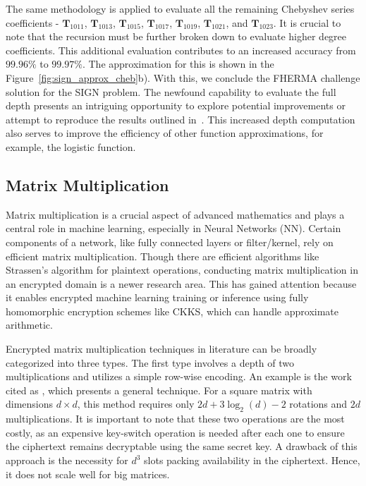 \documentclass[journal=tosc,final]{iacrtrans}
\begin{document}
The same methodology is applied to evaluate all the remaining Chebyshev series coefficients - $\textbf{T}_{1011}$, $\textbf{T}_{1013}$, $\textbf{T}_{1015}$, $\textbf{T}_{1017}$, $\textbf{T}_{1019}$, $\textbf{T}_{1021}$, and $\textbf{T}_{1023}$. It is crucial to note that the recursion must be further broken down to evaluate higher degree coefficients. This additional evaluation contributes to an increased accuracy from $99.96\%$ to $99.97\%$. The approximation for this is shown in the Figure~\ref{fig:sign_approx_cheb}b). With this, we conclude the FHERMA challenge solution for the SIGN problem. The newfound capability to evaluate the full depth presents an intriguing opportunity to explore potential improvements or attempt to reproduce the results outlined in~\cite{Sign_approx_comp_poly}. This increased depth computation also serves to improve the efficiency of other function approximations, for example, the logistic function.

\subsection{Matrix Multiplication}

Matrix multiplication is a crucial aspect of advanced mathematics and plays a central role in machine learning, especially in Neural Networks (NN). Certain components of a network, like fully connected layers or filter/kernel, rely on efficient matrix multiplication. Though there are efficient algorithms like Strassen's algorithm for plaintext operations, conducting matrix multiplication in an encrypted domain is a newer research area. This has gained attention because it enables encrypted machine learning training or inference using fully homomorphic encryption schemes like CKKS, which can handle approximate arithmetic.

Encrypted matrix multiplication techniques in literature can be broadly categorized into three types. The first type involves a depth of two multiplications and utilizes a simple row-wise encoding. An example is the work cited as \cite{mult2_d2}, which presents a general technique. For a square matrix with dimensions $d\times d$, this method requires only $2 d+3\log_2(d)-2$ rotations and $2d$ multiplications. It is important to note that these two operations are the most costly, as an expensive key-switch operation is needed after each one to ensure the ciphertext remains decryptable using the same secret key. A drawback of this approach is the necessity for $d^3$ slots packing availability in the ciphertext. Hence, it does not scale well for big matrices.
\end{document}
